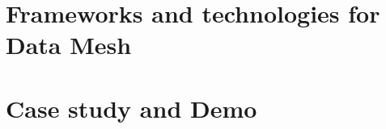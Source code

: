\documentclass[12pt, a4paper]{book}
\begin{document}
\section{Frameworks and technologies for Data Mesh}

\section{Case study and Demo}


\begingroup
\backmatter
{}
\renewcommand\bibname{References}

\endgroup

\clearpage
\end{document}
